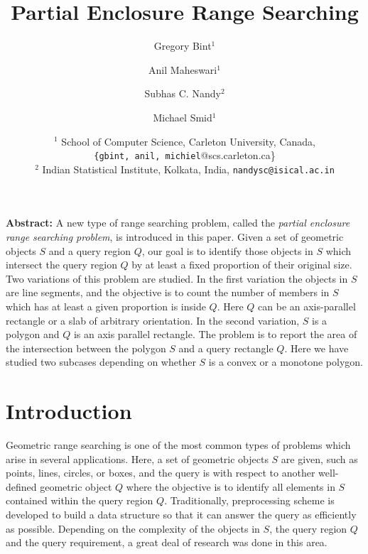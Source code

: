 \documentclass[a4paper,11pt]{article}
\title{Partial Enclosure Range Searching}
\author{Gregory Bint$^1$ \and Anil Maheswari$^1$ \and
        Subhas C. Nandy$^2$ 
        \and Michael Smid$^1$ }
\date{$^1$ School of Computer Science, Carleton University, Canada, \\{\tt \{gbint,
anil, michiel}@scs.carleton.ca\}\\
$^2$ Indian Statistical Institute, Kolkata, India,
{\tt  nandysc@isical.ac.in}}
\begin{document}
\maketitle


{\bf Abstract:}
A new type of range searching problem, called the \emph{partial 
enclosure range searching problem}, is introduced in this paper. 
Given a set of geometric objects $S$ and a query region $Q$, our 
goal is to identify those objects in $S$ which intersect the 
query region $Q$ by at least a fixed proportion of their original 
size. Two variations of this problem are studied. In the first 
variation the objects in $S$ are line segments, and the objective 
is to count the number of members in $S$ which has at least a 
given proportion is inside $Q$. Here $Q$ can be an axis-parallel 
rectangle or a slab of arbitrary orientation. In the second 
variation, $S$ is a polygon and $Q$ is an axis parallel rectangle. 
The problem is to report the area of the intersection between the 
polygon $S$ and a query rectangle $Q$. Here we have studied two 
subcases depending on whether $S$ is a convex or a monotone 
polygon.


\section{Introduction}
Geometric range searching is one of the most common types of 
problems which arise in several applications. Here, a set of 
geometric objects $S$ are given, such as points, lines, circles, 
or boxes, and the query is with respect to another well-defined 
geometric object $Q$ where the objective is to identify all 
elements in $S$ contained within the query region $Q$. 
Traditionally, preprocessing scheme is developed to build a data 
structure so that it can answer the query as efficiently as 
possible. Depending on the complexity of the objects in $S$, the 
query region $Q$ and the query requirement, a great deal of 
research was done in this area.  
\end{document}
